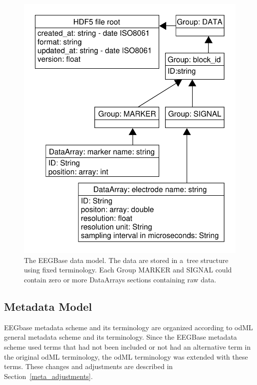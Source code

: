 \documentclass[conference]{IEEEtran}
\begin{document}
\begin{figure}
	\begin{center}
		\includegraphics[scale=0.51]{obrazky/data.pdf}
		\caption{The EEGBase data model. The data are stored in a~tree structure using fixed terminology. Each Group MARKER and SIGNAL could contain zero or more DataArrays sections containing raw data.}
		\label{format_scheme}
	\end{center}
\end{figure}


\subsection{Metadata Model}
\label{odml_section}
EEGbase metadata scheme and its terminology are organized according to odML general metadata scheme and its terminology. Since the EEGBase metadata scheme used terms that had not been included or not had an alternative term in the original odML terminology, the odML terminology was extended with these terms. These changes and adjustments are described in Section~\ref{meta_adjustments}.
\end{document}
